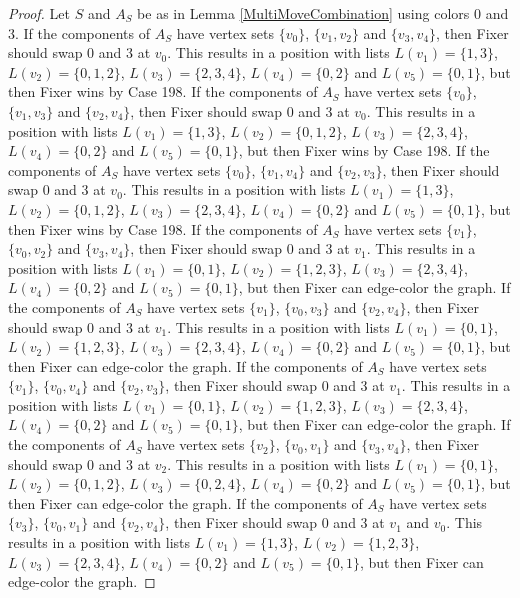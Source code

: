 \documentclass[12pt]{amsart}
\theoremstyle{plain}
\theoremstyle{definition}
\theoremstyle{remark}
\begin{document}
\begin{proof}
Let $S$ and $A_S$ be as in Lemma \ref{MultiMoveCombination} using colors $0$ and $3$. If the components of $A_S$ have vertex sets $\{v_0\}$, $\{v_1, v_2\}$ and $\{v_3, v_4\}$, then Fixer should swap 0 and 3 at $v_0$. This results in a position with lists $L(v_1) = \{1, 3\}$, $L(v_2) = \{0, 1, 2\}$, $L(v_3) = \{2, 3, 4\}$, $L(v_4) = \{0, 2\}$ and $L(v_5) = \{0, 1\}$, but then Fixer wins by Case 198.
If the components of $A_S$ have vertex sets $\{v_0\}$, $\{v_1, v_3\}$ and $\{v_2, v_4\}$, then Fixer should swap 0 and 3 at $v_0$. This results in a position with lists $L(v_1) = \{1, 3\}$, $L(v_2) = \{0, 1, 2\}$, $L(v_3) = \{2, 3, 4\}$, $L(v_4) = \{0, 2\}$ and $L(v_5) = \{0, 1\}$, but then Fixer wins by Case 198.
If the components of $A_S$ have vertex sets $\{v_0\}$, $\{v_1, v_4\}$ and $\{v_2, v_3\}$, then Fixer should swap 0 and 3 at $v_0$. This results in a position with lists $L(v_1) = \{1, 3\}$, $L(v_2) = \{0, 1, 2\}$, $L(v_3) = \{2, 3, 4\}$, $L(v_4) = \{0, 2\}$ and $L(v_5) = \{0, 1\}$, but then Fixer wins by Case 198.
If the components of $A_S$ have vertex sets $\{v_1\}$, $\{v_0, v_2\}$ and $\{v_3, v_4\}$, then Fixer should swap 0 and 3 at $v_1$. This results in a position with lists $L(v_1) = \{0, 1\}$, $L(v_2) = \{1, 2, 3\}$, $L(v_3) = \{2, 3, 4\}$, $L(v_4) = \{0, 2\}$ and $L(v_5) = \{0, 1\}$, but then Fixer can edge-color the graph.
If the components of $A_S$ have vertex sets $\{v_1\}$, $\{v_0, v_3\}$ and $\{v_2, v_4\}$, then Fixer should swap 0 and 3 at $v_1$. This results in a position with lists $L(v_1) = \{0, 1\}$, $L(v_2) = \{1, 2, 3\}$, $L(v_3) = \{2, 3, 4\}$, $L(v_4) = \{0, 2\}$ and $L(v_5) = \{0, 1\}$, but then Fixer can edge-color the graph.
If the components of $A_S$ have vertex sets $\{v_1\}$, $\{v_0, v_4\}$ and $\{v_2, v_3\}$, then Fixer should swap 0 and 3 at $v_1$. This results in a position with lists $L(v_1) = \{0, 1\}$, $L(v_2) = \{1, 2, 3\}$, $L(v_3) = \{2, 3, 4\}$, $L(v_4) = \{0, 2\}$ and $L(v_5) = \{0, 1\}$, but then Fixer can edge-color the graph.
If the components of $A_S$ have vertex sets $\{v_2\}$, $\{v_0, v_1\}$ and $\{v_3, v_4\}$, then Fixer should swap 0 and 3 at $v_2$. This results in a position with lists $L(v_1) = \{0, 1\}$, $L(v_2) = \{0, 1, 2\}$, $L(v_3) = \{0, 2, 4\}$, $L(v_4) = \{0, 2\}$ and $L(v_5) = \{0, 1\}$, but then Fixer can edge-color the graph.
If the components of $A_S$ have vertex sets $\{v_3\}$, $\{v_0, v_1\}$ and $\{v_2, v_4\}$, then Fixer should swap 0 and 3 at $v_1$ and $v_0$. This results in a position with lists $L(v_1) = \{1, 3\}$, $L(v_2) = \{1, 2, 3\}$, $L(v_3) = \{2, 3, 4\}$, $L(v_4) = \{0, 2\}$ and $L(v_5) = \{0, 1\}$, but then Fixer can edge-color the graph.

\end{proof}
\end{document}
